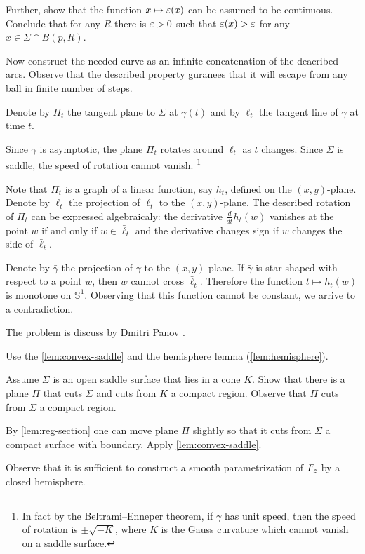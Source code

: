 Further, show that the function $x\mapsto\varepsilon(x)$ can be assumed to be continuous.
Conclude that for any $R$ there is $\varepsilon>0$ such that $\varepsilon(x)>\varepsilon$ for any $x\in\Sigma\cap B(p,R)$.

Now construct the needed curve as an infinite concatenation of the deacribed arcs.
Observe that the described property guranees that it will escape from any ball in finite number of steps.

 Denote by $\Pi_t$ the tangent plane to $\Sigma$ at $\gamma(t)$ and by $\ell_t$ the tangent line of $\gamma$ at time $t$.

Since $\gamma$ is asymptotic, the plane $\Pi_t$ rotates around $\ell_t$ as $t$ changes.
Since $\Sigma$ is saddle, the speed of rotation cannot vanish.%
\footnote{In fact by the Beltrami--Enneper theorem, if $\gamma$ has unit speed, then the speed of rotation is $\pm\sqrt{-K}$, where $K$ is the Gauss curvature which cannot vanish on a saddle surface.}

Note that $\Pi_t$ is a graph of a linear function, say $h_t$, defined on the $(x, y)$-plane.
Denote by $\bar\ell_t$ the projection of $\ell_t$ to the $(x, y)$-plane.
The described rotation of $\Pi_t$ can be expressed algebraicaly:
the derivative $\tfrac{d}{dt}h_t(w)$ vanishes at the point $w$ if and only if $w\in \bar\ell_t$ 
and the derivative changes sign if $w$ changes the side of $\bar\ell_t$.

Denote by $\bar\gamma$ the projection of $\gamma$ to the $(x, y)$-plane.
If $\bar\gamma$ is star shaped with respect to a point $w$, then $w$ cannot cross $\bar\ell_t$.
Therefore the function $t\mapsto h_t(w)$ is monotone on $\mathbb{S}^1$.
Observing that this function cannot be constant, we arrive to a contradiction.

 The problem is discuss by Dmitri Panov \cite{panov-curves}.

 Use the \ref{lem:convex-saddle} and the hemisphere lemma (\ref{lem:hemisphere}).

Assume $\Sigma$ is an open saddle surface that lies in a cone $K$.
Show that there is a plane $\Pi$ that cuts $\Sigma$ and cuts from $K$ a compact region.
Observe that $\Pi$ cuts from $\Sigma$ a compact region.

By \ref{lem:reg-section} one can move plane $\Pi$ slightly so that it cuts from $\Sigma$ a compact surface with boundary.
Apply \ref{lem:convex-saddle}.


 Observe that it is sufficient to construct a smooth parametrization of $F_\varepsilon$ by a closed hemisphere.

